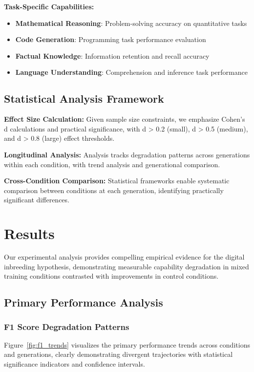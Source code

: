 \documentclass{article}
\begin{document}
\textbf{Task-Specific Capabilities:}
\begin{itemize}
    \item \textbf{Mathematical Reasoning}: Problem-solving accuracy on quantitative tasks
    \item \textbf{Code Generation}: Programming task performance evaluation
    \item \textbf{Factual Knowledge}: Information retention and recall accuracy
    \item \textbf{Language Understanding}: Comprehension and inference task performance
\end{itemize}

\subsection{Statistical Analysis Framework}

\textbf{Effect Size Calculation:} Given sample size constraints, we emphasize Cohen's d calculations and practical significance, with d > 0.2 (small), d > 0.5 (medium), and d > 0.8 (large) effect thresholds.

\textbf{Longitudinal Analysis:} Analysis tracks degradation patterns across generations within each condition, with trend analysis and generational comparison.

\textbf{Cross-Condition Comparison:} Statistical frameworks enable systematic comparison between conditions at each generation, identifying practically significant differences.

\section{Results}

Our experimental analysis provides compelling empirical evidence for the digital inbreeding hypothesis, demonstrating measurable capability degradation in mixed training conditions contrasted with improvements in control conditions.

\subsection{Primary Performance Analysis}

\subsubsection{F1 Score Degradation Patterns}

Figure~\ref{fig:f1_trends} visualizes the primary performance trends across conditions and generations, clearly demonstrating divergent trajectories with statistical significance indicators and confidence intervals.
\end{document}
